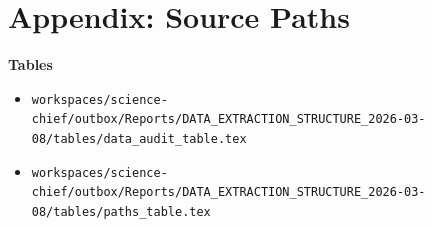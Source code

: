 \documentclass[11pt,a4paper]{article}
\begin{document}
\section*{Appendix: Source Paths}
\textbf{Tables}\\
\begin{itemize}
\item \texttt{workspaces/science-chief/outbox/Reports/DATA\_EXTRACTION\_STRUCTURE\_2026-03-08/tables/data\_audit\_table.tex}
\item \texttt{workspaces/science-chief/outbox/Reports/DATA\_EXTRACTION\_STRUCTURE\_2026-03-08/tables/paths\_table.tex}
\end{itemize}
\end{document}
